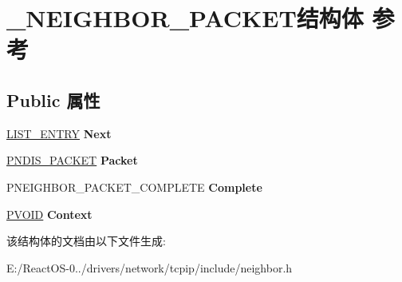 \hypertarget{struct___n_e_i_g_h_b_o_r___p_a_c_k_e_t}{}\section{\+\_\+\+N\+E\+I\+G\+H\+B\+O\+R\+\_\+\+P\+A\+C\+K\+E\+T结构体 参考}
\label{struct___n_e_i_g_h_b_o_r___p_a_c_k_e_t}
\subsection*{Public 属性}
\begin{DoxyCompactItemize}
\item 
\mbox{\label{struct___n_e_i_g_h_b_o_r___p_a_c_k_e_t_a7e5b9ea058320f4b6c4a6c8b8e1183b7}} 
\hyperlink{struct___l_i_s_t___e_n_t_r_y}{L\+I\+S\+T\+\_\+\+E\+N\+T\+RY} {\bfseries Next}
\item 
\mbox{\label{struct___n_e_i_g_h_b_o_r___p_a_c_k_e_t_ae3bf8c56457bdac226e61c46b5c78144}} 
\hyperlink{struct___n_d_i_s___p_a_c_k_e_t}{P\+N\+D\+I\+S\+\_\+\+P\+A\+C\+K\+ET} {\bfseries Packet}
\item 
\mbox{\label{struct___n_e_i_g_h_b_o_r___p_a_c_k_e_t_afd9c17011d1ff42b96fa6fee47303c6d}} 
P\+N\+E\+I\+G\+H\+B\+O\+R\+\_\+\+P\+A\+C\+K\+E\+T\+\_\+\+C\+O\+M\+P\+L\+E\+TE {\bfseries Complete}
\item 
\mbox{\label{struct___n_e_i_g_h_b_o_r___p_a_c_k_e_t_a626af9be7144c8962db26047f60d69fe}} 
\hyperlink{interfacevoid}{P\+V\+O\+ID} {\bfseries Context}
\end{DoxyCompactItemize}


该结构体的文档由以下文件生成\+:\begin{DoxyCompactItemize}
\item 
E\+:/\+React\+O\+S-\/0../drivers/network/tcpip/include/neighbor.\+h\end{DoxyCompactItemize}

